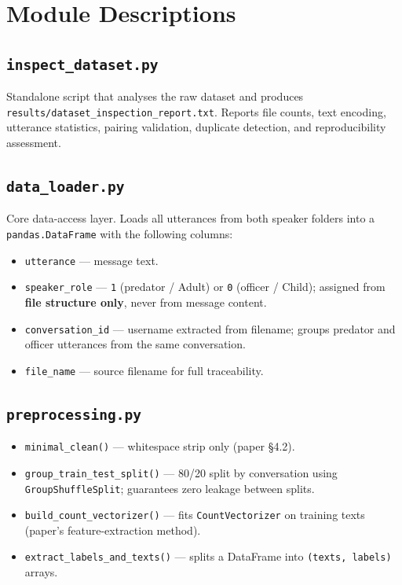 \documentclass[12pt,a4paper]{article}
\begin{document}
\section{Module Descriptions}

\subsection{\texttt{inspect\_dataset.py}}

Standalone script that analyses the raw dataset and produces
\texttt{results/dataset\_inspection\_report.txt}. Reports file counts,
text encoding, utterance statistics, pairing validation, duplicate
detection, and reproducibility assessment.

\subsection{\texttt{data\_loader.py}}

Core data-access layer. Loads all utterances from both speaker folders
into a \texttt{pandas.DataFrame} with the following columns:

\begin{itemize}[leftmargin=*]
  \item \texttt{utterance} --- message text.
  \item \texttt{speaker\_role} --- \texttt{1} (predator / Adult) or
        \texttt{0} (officer / Child); assigned from \textbf{file structure
        only}, never from message content.
  \item \texttt{conversation\_id} --- username extracted from filename;
        groups predator and officer utterances from the same conversation.
  \item \texttt{file\_name} --- source filename for full traceability.
\end{itemize}

\subsection{\texttt{preprocessing.py}}

\begin{itemize}[leftmargin=*]
  \item \texttt{minimal\_clean()} --- whitespace strip only (paper \S4.2).
  \item \texttt{group\_train\_test\_split()} --- 80/20 split by
        conversation using \texttt{GroupShuffleSplit}; guarantees zero
        leakage between splits.
  \item \texttt{build\_count\_vectorizer()} --- fits \texttt{CountVectorizer}
        on training texts (paper's feature-extraction method).
  \item \texttt{extract\_labels\_and\_texts()} --- splits a DataFrame into
        \texttt{(texts, labels)} arrays.
\end{itemize}
\end{document}
